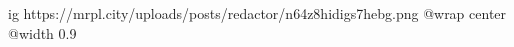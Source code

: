  
 
 
 
 

\ifcmt
  ig https://mrpl.city/uploads/posts/redactor/n64z8hidigs7hebg.png
  @wrap center
  @width 0.9
\fi
